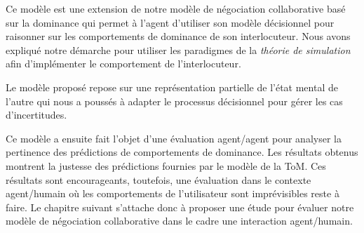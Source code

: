 	Ce modèle est une extension de notre modèle de négociation collaborative basé sur la dominance qui permet à l'agent d'utiliser son modèle décisionnel pour raisonner sur les comportements de dominance de son interlocuteur. Nous avons expliqué notre démarche pour utiliser les paradigmes de la \emph{théorie de simulation} afin d'implémenter le comportement de l'interlocuteur. 
	
	Le modèle proposé repose sur une représentation partielle de l'état mental de l'autre qui nous a poussés à adapter le processus décisionnel pour gérer les cas d'incertitudes. 
	
	Ce modèle a ensuite fait l'objet d'une évaluation agent/agent pour analyser la pertinence des prédictions de comportements de dominance. Les résultats obtenus montrent la justesse des prédictions fournies par le modèle de la ToM. Ces résultats sont encourageants, toutefois, une évaluation dans le contexte agent/humain où les comportements de l'utilisateur sont imprévisibles reste à faire. Le chapitre suivant s'attache donc à proposer une étude pour évaluer notre modèle de négociation collaborative dans le cadre une interaction agent/humain.